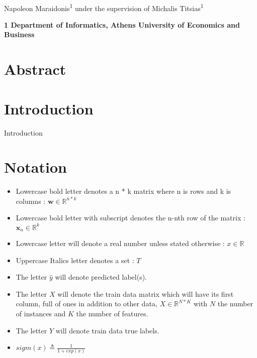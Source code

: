 \documentclass[10pt,letterpaper]{article}
\begin{document}
\vspace*{0.35in}
	\begin{flushleft}
		{\Large
			\textbf{}
		}
		\newline
		\\
		Napoleon Maraidonis\textsuperscript{1} under the supervision of
		Michalis Titsias\textsuperscript{1}		
						
		\bigskip
		\bf{1} Department of Informatics, Athens University of Economics and Business
		\\		
	\end{flushleft}
	
	\section*{Abstract}
	
	
	\section*{Introduction}
	
	Introduction \cite{extreme_MLC_omar} \cite{extreme_MLC_rep} \cite{MLC_finland}
	

	\section*{Notation}

	\begin{itemize}
		\item Lowercase bold letter denotes a n * k matrix where n is rows and k is columns :  $\textbf{w} \in  {\mathbb R}^{n * k}$
		
		\item Lowercase bold letter with subscript denotes the n-nth row of the matrix : $\textbf{x}_{n} \in  {\mathbb R}^{k}$
				
		\item Lowercase letter will denote a real number unless stated otherwise	:	$x \in {\mathbb R}$
		
		\item Uppercase Italics letter denotes a set : $\textit{T} $
		
		\item The letter $\hat{y}$ will denote predicted label(s).
		
		\item The letter $X$ will denote the train data matrix which will have its first column, full of ones in addition to other data, $X \in {\mathbb R}^{N * K}$ with $N$ the number of instances and $K$ the number of features.
		
		\item The letter $Y$ will denote train data true labels.
		
		\item $sigm(x) \triangleq \frac{1}{1 + exp(x)}$
		

	\end{itemize}
	\newpage
	
\end{document}
